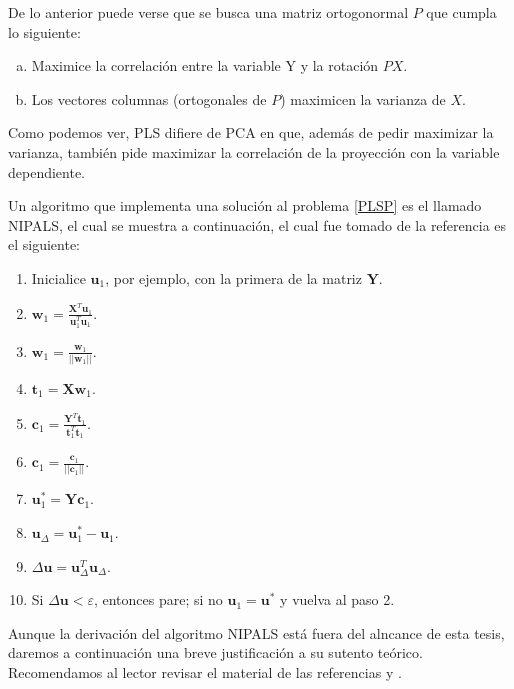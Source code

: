 De lo anterior puede verse que se busca una matriz ortogonormal $P$ que cumpla lo siguiente: 

\begin{enumerate}[a)]
\item Maximice la correlación entre la variable Y y la rotación $PX$.
\item Los vectores columnas (ortogonales de $P$) maximicen la varianza de $X$.
\end{enumerate}

Como podemos ver, PLS difiere de PCA en que, además de pedir maximizar la varianza, también pide maximizar la correlación de la proyección con la variable dependiente. 

Un algoritmo que implementa una solución al problema \ref{PLSP} es el llamado NIPALS, el cual se muestra a continuación, el cual fue tomado de la referencia \cite{pls} es el siguiente: 

\begin{enumerate}

\item Inicialice $\mathbf{u}_{1}$, por ejemplo, con la primera de la matriz $\mathbf{Y}$.
\item $\mathbf{w}_{1} = \frac{\mathbf{X}^{T}\mathbf{u}_{1}}{\mathbf{u}_{1}^{T}\mathbf{u}_{1}}$.
\item $\mathbf{w}_{1} = \frac{\mathbf{w}_{1}}{||\mathbf{w}_{1}||}$.
\item $\mathbf{t}_{1} = \mathbf{X}\mathbf{w}_{1}$.
\item $\mathbf{c}_{1} = \frac{\mathbf{Y}^{T}\mathbf{t}_{1}}{\mathbf{t}_{1}^{T}\mathbf{t}_{1}}$.
\item $\mathbf{c}_{1} = \frac{\mathbf{c}_{1}}{||\mathbf{c}_{1}||}$.
\item $\mathbf{u}_{1}^{*} = \mathbf{Y}\mathbf{c}_{1}$.
\item $\mathbf{u}_{\Delta} = \mathbf{u}_{1}^{*} - \mathbf{u}_{1}$.
\item $\Delta\mathbf{u} = \mathbf{u}_{\Delta}^{T}\mathbf{u}_{\Delta}$.
\item Si $\Delta \mathbf{u} < \varepsilon$, entonces pare; si no $\mathbf{u}_{1} = \mathbf{u}^{*}$ y vuelva  al paso 2.
\setcounter{enumTemp}{\theenumi}
\end{enumerate}

Aunque la  derivación del algoritmo NIPALS está fuera del alncance de esta tesis, daremos a continuación una breve justificación a su sutento teórico. Recomendamos al lector revisar el material de las referencias \cite{nipals} y \cite{nipals2}.


